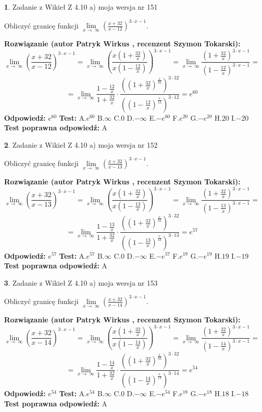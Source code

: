\documentclass[12pt, a4paper]{article}
\theoremstyle{definition} %
\newtheorem{zad}{}
\newcommand{\zadStart}[1]{\begin{zad}#1\newline}
\newcommand{\zadStop}{\end{zad}}
\newcommand{\rozwStart}[2]{\noindent \textbf{Rozwiązanie (autor #1 , recenzent #2): }\newline}
\newcommand{\rozwStop}{\newline}
\newcommand{\odpStart}{\noindent \textbf{Odpowiedź:}\newline}
\newcommand{\odpStop}{\newline}
\newcommand{\testStart}{\noindent \textbf{Test:}\newline}
\newcommand{\testStop}{\newline}
\newcommand{\kluczStart}{\noindent \textbf{Test poprawna odpowiedź:}\newline}
\newcommand{\kluczStop}{\newline}
\begin{document}
\zadStart{Zadanie z Wikieł Z 4.10 a) moja wersja nr 151}

Obliczyć granicę funkcji  $\lim\limits_{x\to\ \infty}(\frac{x+32}{x-12})^{3\cdot x-1}$.
\zadStop
\rozwStart{Patryk Wirkus}{Szymon Tokarski}
$$\lim\limits_{x\to\ \infty}(\frac{x+32}{x-12})^{3\cdot x-1} = \lim\limits_{x\to\ \infty}(\frac{x(1+\frac{32}{x})}{x(1-\frac{12}{x})})^{3\cdot x-1}=\lim\limits_{x\to\ \infty}\frac{(1+\frac{32}{x})^{3\cdot x-1}}{(1-\frac{12}{x})^{3\cdot x-1}}=$$
$$=\lim\limits_{x\to\ \infty}\frac{1-\frac{12}{x}}{1+\frac{32}{x}}\cdot\frac{((1+\frac{32}{x})^{\frac{x}{32}})^{3\cdot32}}{((1-\frac{12}{x})^{\frac{x}{12}})^{3\cdot12}}=e^{60}$$
\rozwStop
\odpStart
$e^{60}$
\odpStop
\testStart
A.$e^{60}$ B.$\infty$ C.$0$ D.$-\infty$ E.$-e^{60}$
F.$e^{20}$ G.$-e^{20}$
H.$20$
I.$-20$
\testStop
\kluczStart
A
\kluczStop



\zadStart{Zadanie z Wikieł Z 4.10 a) moja wersja nr 152}

Obliczyć granicę funkcji  $\lim\limits_{x\to\ \infty}(\frac{x+32}{x-13})^{3\cdot x-1}$.
\zadStop
\rozwStart{Patryk Wirkus}{Szymon Tokarski}
$$\lim\limits_{x\to\ \infty}(\frac{x+32}{x-13})^{3\cdot x-1} = \lim\limits_{x\to\ \infty}(\frac{x(1+\frac{32}{x})}{x(1-\frac{13}{x})})^{3\cdot x-1}=\lim\limits_{x\to\ \infty}\frac{(1+\frac{32}{x})^{3\cdot x-1}}{(1-\frac{13}{x})^{3\cdot x-1}}=$$
$$=\lim\limits_{x\to\ \infty}\frac{1-\frac{13}{x}}{1+\frac{32}{x}}\cdot\frac{((1+\frac{32}{x})^{\frac{x}{32}})^{3\cdot32}}{((1-\frac{13}{x})^{\frac{x}{13}})^{3\cdot13}}=e^{57}$$
\rozwStop
\odpStart
$e^{57}$
\odpStop
\testStart
A.$e^{57}$ B.$\infty$ C.$0$ D.$-\infty$ E.$-e^{57}$
F.$e^{19}$ G.$-e^{19}$
H.$19$
I.$-19$
\testStop
\kluczStart
A
\kluczStop



\zadStart{Zadanie z Wikieł Z 4.10 a) moja wersja nr 153}

Obliczyć granicę funkcji  $\lim\limits_{x\to\ \infty}(\frac{x+32}{x-14})^{3\cdot x-1}$.
\zadStop
\rozwStart{Patryk Wirkus}{Szymon Tokarski}
$$\lim\limits_{x\to\ \infty}(\frac{x+32}{x-14})^{3\cdot x-1} = \lim\limits_{x\to\ \infty}(\frac{x(1+\frac{32}{x})}{x(1-\frac{14}{x})})^{3\cdot x-1}=\lim\limits_{x\to\ \infty}\frac{(1+\frac{32}{x})^{3\cdot x-1}}{(1-\frac{14}{x})^{3\cdot x-1}}=$$
$$=\lim\limits_{x\to\ \infty}\frac{1-\frac{14}{x}}{1+\frac{32}{x}}\cdot\frac{((1+\frac{32}{x})^{\frac{x}{32}})^{3\cdot32}}{((1-\frac{14}{x})^{\frac{x}{14}})^{3\cdot14}}=e^{54}$$
\rozwStop
\odpStart
$e^{54}$
\odpStop
\testStart
A.$e^{54}$ B.$\infty$ C.$0$ D.$-\infty$ E.$-e^{54}$
F.$e^{18}$ G.$-e^{18}$
H.$18$
I.$-18$
\testStop
\kluczStart
A
\kluczStop
\end{document}
